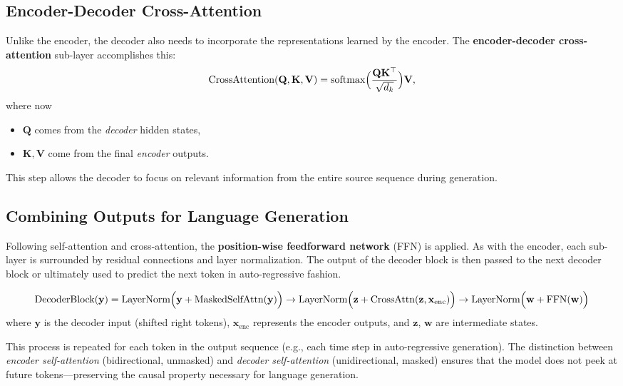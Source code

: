 \subsection{Encoder-Decoder Cross-Attention}
\noindent
Unlike the encoder, the decoder also needs to incorporate the representations learned by the encoder. The \textbf{encoder-decoder cross-attention} sub-layer accomplishes this:
\[
\text{CrossAttention}(\mathbf{Q}, \mathbf{K}, \mathbf{V}) 
= \text{softmax}\Bigl(\frac{\mathbf{Q}\mathbf{K}^\top}{\sqrt{d_k}}\Bigr)\mathbf{V},
\]
where now
\begin{itemize}
    \item $\mathbf{Q}$ comes from the \emph{decoder} hidden states,
    \item $\mathbf{K}, \mathbf{V}$ come from the final \emph{encoder} outputs.
\end{itemize}
This step allows the decoder to focus on relevant information from the entire source sequence during generation.

\subsection{Combining Outputs for Language Generation}
\noindent
Following self-attention and cross-attention, the \textbf{position-wise feedforward network} (FFN) is applied. As with the encoder, each sub-layer is surrounded by residual connections and layer normalization. The output of the decoder block is then passed to the next decoder block or ultimately used to predict the next token in auto-regressive fashion.

\begin{equation}\label{eq:decoder_block}
\text{DecoderBlock}(\mathbf{y}) = 
\text{LayerNorm}\Bigl(\mathbf{y} + \text{MaskedSelfAttn}(\mathbf{y})\Bigr)
\rightarrow
\text{LayerNorm}\Bigl(\mathbf{z} + \text{CrossAttn}(\mathbf{z}, \mathbf{x}_{\text{enc}})\Bigr)
\rightarrow
\text{LayerNorm}\Bigl(\mathbf{w} + \text{FFN}(\mathbf{w})\Bigr)
\end{equation}
where $\mathbf{y}$ is the decoder input (shifted right tokens), $\mathbf{x}_{\text{enc}}$ represents the encoder outputs, and $\mathbf{z}$, $\mathbf{w}$ are intermediate states.

\noindent
This process is repeated for each token in the output sequence (e.g., each time step in auto-regressive generation). The distinction between \emph{encoder self-attention} (bidirectional, unmasked) and \emph{decoder self-attention} (unidirectional, masked) ensures that the model does not peek at future tokens—preserving the causal property necessary for language generation.


